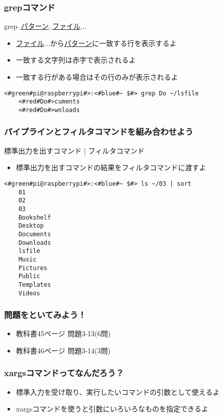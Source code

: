 \begin{frame}[fragile]
    \frametitle{grepコマンド}
    grep␣\underline{パターン}␣\underline{ファイル}$\ldots$
    \begin{itemize}
        \item \underline{ファイル}$\ldots$から\underline{パターン}に一致する行を表示するよ
        \item 一致する文字列は赤字で表示されるよ
        \item 一致する行がある場合はその行のみが表示されるよ
    \end{itemize}
    \begin{lstlisting}[title=grepコマンドの実行例, label=grep_example]
    <#green#pi@raspberrypi#>:<#blue#~ $#> grep Do ~/lsfile
    <#red#Do#>cuments
    <#red#Do#>wnloads
    \end{lstlisting}
\end{frame}

\begin{frame}[fragile]
    \frametitle{パイプラインとフィルタコマンドを組み合わせよう}
    標準出力を出すコマンド | フィルタコマンド
    \begin{itemize}
        \item 標準出力を出すコマンドの結果をフィルタコマンドに渡すよ
    \end{itemize}
    \begin{lstlisting}[title=パイプラインを用いたsortコマンドの実行例, label=sort_example]
    <#green#pi@raspberrypi#>:<#blue#~ $#> ls ~/03 | sort
    01
    02
    03
    Bookshelf
    Desktop
    Documents
    Downloads
    lsfile
    Music
    Pictures
    Public
    Templates
    Videos
    \end{lstlisting}
\end{frame}

\begin{frame}
    \frametitle{問題をといてみよう！}
    \begin{itemize}
        \item 教科書45ページ 問題3-13(6問)
        \item 教科書46ページ 問題3-14(3問)
    \end{itemize}
\end{frame}

\begin{frame}
    \frametitle{xargsコマンドってなんだろう？}
    \begin{itemize}
        \item 標準入力を受け取り、実行したいコマンドの引数として使えるよ
        \item xargsコマンドを使うと引数にいろいろなものを指定できるよ
    \end{itemize}
    \begin{figure}
        \centering
        
    \end{figure}
\end{frame}

